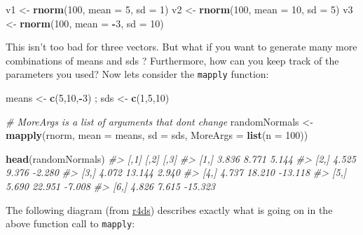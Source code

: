 \documentclass[]{book}
\makeatletter
\newenvironment{Shaded}{\begin{snugshade}}{\end{snugshade}}
\newcommand{\KeywordTok}[1]{\textcolor[rgb]{0.13,0.29,0.53}{\textbf{#1}}}
\newcommand{\DataTypeTok}[1]{\textcolor[rgb]{0.13,0.29,0.53}{#1}}
\newcommand{\DecValTok}[1]{\textcolor[rgb]{0.00,0.00,0.81}{#1}}
\newcommand{\StringTok}[1]{\textcolor[rgb]{0.31,0.60,0.02}{#1}}
\newcommand{\CommentTok}[1]{\textcolor[rgb]{0.56,0.35,0.01}{\textit{#1}}}
\newcommand{\OperatorTok}[1]{\textcolor[rgb]{0.81,0.36,0.00}{\textbf{#1}}}
\newcommand{\NormalTok}[1]{#1}
\newenvironment{kframe}{%
\medskip{}
\setlength{\fboxsep}{.8em}
 \def\at@end@of@kframe{}%
 \ifinner\ifhmode%
  \def\at@end@of@kframe{\end{minipage}}%
  \begin{minipage}{\columnwidth}%
 \fi\fi%
 \def\FrameCommand##1{\hskip\@totalleftmargin \hskip-\fboxsep
 \colorbox{shadecolor}{##1}\hskip-\fboxsep
     \hskip-\linewidth \hskip-\@totalleftmargin \hskip\columnwidth}%
 \MakeFramed {\advance\hsize-\width
   \@totalleftmargin\z@ \linewidth\hsize
   \@setminipage}}%
 {\par\unskip\endMakeFramed%
 \at@end@of@kframe}
\renewenvironment{Shaded}{\begin{kframe}}{\end{kframe}}
\theoremstyle{definition}
\theoremstyle{definition}
\theoremstyle{definition}
\theoremstyle{remark}
\makeatother
\begin{document}
\begin{Shaded}
\begin{Highlighting}[]
\NormalTok{v1 <-}\StringTok{ }\KeywordTok{rnorm}\NormalTok{(}\DecValTok{100}\NormalTok{, }\DataTypeTok{mean =} \DecValTok{5}\NormalTok{, }\DataTypeTok{sd =} \DecValTok{1}\NormalTok{)}
\NormalTok{v2 <-}\StringTok{ }\KeywordTok{rnorm}\NormalTok{(}\DecValTok{100}\NormalTok{, }\DataTypeTok{mean =} \DecValTok{10}\NormalTok{, }\DataTypeTok{sd =} \DecValTok{5}\NormalTok{)}
\NormalTok{v3 <-}\StringTok{ }\KeywordTok{rnorm}\NormalTok{(}\DecValTok{100}\NormalTok{, }\DataTypeTok{mean =} \OperatorTok{-}\DecValTok{3}\NormalTok{, }\DataTypeTok{sd =} \DecValTok{10}\NormalTok{)}
\end{Highlighting}
\end{Shaded}

This isn't too bad for three vectors. But what if you want to generate
many more combinations of means and sds ? Furthermore, how can you keep
track of the parameters you used? Now lets consider the \texttt{mapply}
function:

\begin{Shaded}
\begin{Highlighting}[]
\NormalTok{means <-}\StringTok{ }\KeywordTok{c}\NormalTok{(}\DecValTok{5}\NormalTok{,}\DecValTok{10}\NormalTok{,}\OperatorTok{-}\DecValTok{3}\NormalTok{) ; sds <-}\StringTok{ }\KeywordTok{c}\NormalTok{(}\DecValTok{1}\NormalTok{,}\DecValTok{5}\NormalTok{,}\DecValTok{10}\NormalTok{) }

\CommentTok{# MoreArgs is a list of arguments that dont change}
\NormalTok{randomNormals <-}\StringTok{ }\KeywordTok{mapply}\NormalTok{(rnorm, }\DataTypeTok{mean =}\NormalTok{ means, }\DataTypeTok{sd =}\NormalTok{ sds, }
                        \DataTypeTok{MoreArgs =} \KeywordTok{list}\NormalTok{(}\DataTypeTok{n =} \DecValTok{100}\NormalTok{))}

\KeywordTok{head}\NormalTok{(randomNormals)}
\CommentTok{#>       [,1]   [,2]    [,3]}
\CommentTok{#> [1,] 3.836  8.771   5.144}
\CommentTok{#> [2,] 4.525  9.376  -2.280}
\CommentTok{#> [3,] 4.072 13.144   2.940}
\CommentTok{#> [4,] 4.737 18.210 -13.118}
\CommentTok{#> [5,] 5.690 22.951  -7.008}
\CommentTok{#> [6,] 4.826  7.615 -15.323}
\end{Highlighting}
\end{Shaded}

The following diagram (from
\href{http://r4ds.had.co.nz/iteration.html\#mapping-over-multiple-arguments}{r4ds})
describes exactly what is going on in the above function call to
\texttt{mapply}:
\end{document}
